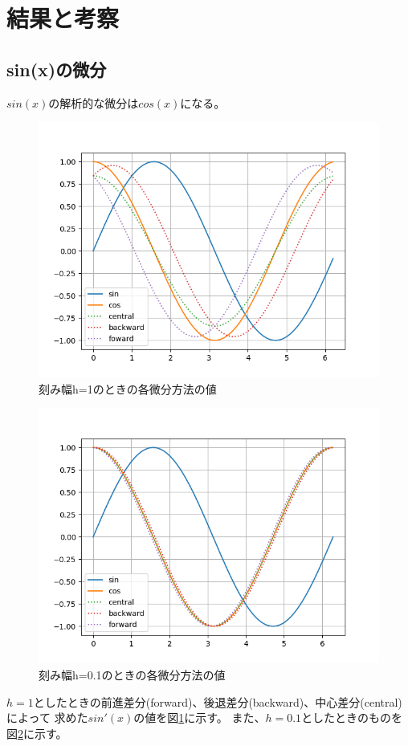 \documentclass[dvipdfmx]{jsarticle}
\begin{document}
\section{結果と考察}

\subsection{sin(x)の微分}
$sin(x)$の解析的な微分は$cos(x)$になる。

\begin{figure}[htbp]
  \centering
  \includegraphics[width=0.7\hsize]{../pics/h=1.png}
  \caption{刻み幅h=1のときの各微分方法の値}
  \label{fig:h_1}
\end{figure}

\begin{figure}[htbp]
  \centering
  \includegraphics[width=0.7\hsize]{../pics/h=0_1.png}
  \caption{刻み幅h=0.1のときの各微分方法の値}
  \label{fig:h_01}
\end{figure}

$h=1$としたときの前進差分(forward)、後退差分(backward)、中心差分(central)によって
求めた$sin'(x)$の値を図\ref{fig:h_1}に示す。
また、$h=0.1$としたときのものを図\ref{fig:h_01}に示す。
\end{document}
